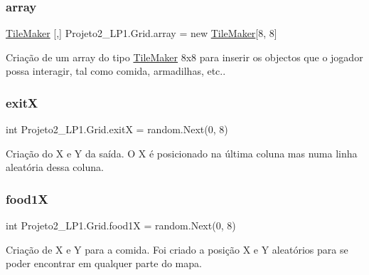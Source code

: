 \subsubsection{\texorpdfstring{array}{array}}
{\footnotesize\ttfamily \mbox{\hyperlink{class_projeto2___l_p1_1_1_tile_maker}{Tile\+Maker}} \mbox{[},\mbox{]} Projeto2\+\_\+\+L\+P1.\+Grid.\+array = new \mbox{\hyperlink{class_projeto2___l_p1_1_1_tile_maker}{Tile\+Maker}}\mbox{[}8, 8\mbox{]}}



Criação de um array do tipo \mbox{\hyperlink{class_projeto2___l_p1_1_1_tile_maker}{Tile\+Maker}} 8x8 para inserir os objectos que o jogador possa interagir, tal como comida, armadilhas, etc.. 

\mbox{\label{class_projeto2___l_p1_1_1_grid_a1fbb4462007865226251bc5c084e616e}} 
\subsubsection{\texorpdfstring{exitX}{exitX}}
{\footnotesize\ttfamily int Projeto2\+\_\+\+L\+P1.\+Grid.\+exitX = random.\+Next(0, 8)}



Criação do X e Y da saída. O X é posicionado na última coluna mas numa linha aleatória dessa coluna. 

\mbox{\label{class_projeto2___l_p1_1_1_grid_aa058efe324b104363e8e062c670f2261}} 
\subsubsection{\texorpdfstring{food1X}{food1X}}
{\footnotesize\ttfamily int Projeto2\+\_\+\+L\+P1.\+Grid.\+food1X = random.\+Next(0, 8)}



Criação de X e Y para a comida. Foi criado a posição X e Y aleatórios para se poder encontrar em qualquer parte do mapa. 

\mbox{\label{class_projeto2___l_p1_1_1_grid_aceb1cce0decd21c4032bf01968c1dbb6}} 
